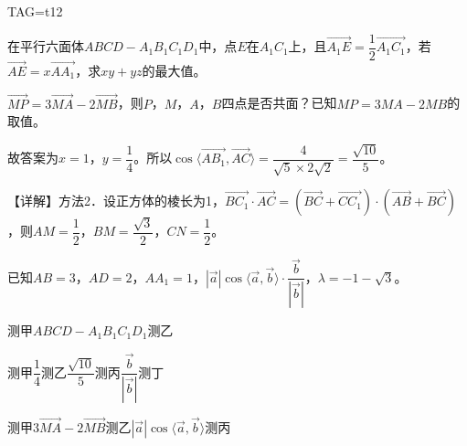 \documentclass[fontset=none]{ctexart}
\let\frac\dfrac
\begin{document}
\noindent TAG=t12

\noindent 在平行六面体\(ABCD-A_1B_1C_1D_1\)中，点\(E\)在\(A_1C_1\)上，且\(\overrightarrow{A_1E}=\frac{1}{2}\overrightarrow{A_1C_1}\)，若\(\overrightarrow{AE}=x\overrightarrow{AA_1}\)，求\(xy+yz\)的最大值。

\noindent \(\overrightarrow{MP}=3\overrightarrow{MA}-2\overrightarrow{MB}\)，则\(P\)，\(M\)，\(A\)，\(B\)四点是否共面？已知\(MP=3MA-2MB\)的取值。

\noindent 故答案为\(x=1\)，\(y=\frac{1}{4}\)。所以\(\cos\langle \overrightarrow{AB_1},\overrightarrow{AC}\rangle=\frac{4}{\sqrt{5}\times2\sqrt{2}}=\frac{\sqrt{10}}{5}\)。

\noindent 【详解】方法2．设正方体的棱长为1，\(\overrightarrow{BC_{1}} \cdot \overrightarrow{AC} = ( \overrightarrow{BC} + \overrightarrow{CC_{1}} ) \cdot ( \overrightarrow{AB} + \overrightarrow{BC} )\)，则\(AM = \frac{1}{2}\)，\(BM = \frac{\sqrt{3}}{2}\)，\(CN = \frac{1}{2}\)。

\noindent 已知\(AB=3\)，\(AD=2\)，\(AA_1=1\)，\(| \overrightarrow{a} |\cos\langle \overrightarrow{a},\overrightarrow{b} \rangle \cdot \frac{\overrightarrow{b}}{| \overrightarrow{b} |}\)，\(\lambda=-1-\sqrt{3}\)。

\noindent 测甲\(ABCD-A_1B_1C_1D_1\)测乙

\noindent 测甲\(\frac{1}{4}\)测乙\(\frac{\sqrt{10}}{5}\)测丙\(\frac{\overrightarrow{b}}{| \overrightarrow{b} |}\)测丁

\noindent 测甲\(3\overrightarrow{MA}-2\overrightarrow{MB}\)测乙\(| \overrightarrow{a} |\cos\langle \overrightarrow{a},\overrightarrow{b} \rangle\)测丙
\end{document}
